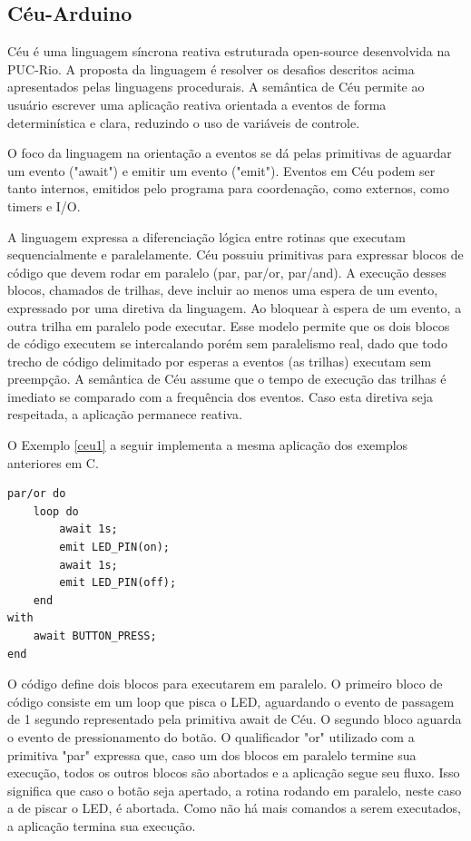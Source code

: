 \documentclass[11pt]{article}
\begin{document}
\subsection{Céu-Arduino}
\tab Céu é uma linguagem síncrona reativa estruturada open-source desenvolvida na PUC-Rio.\cite{santanna2012}\cite{githubceu} A proposta da linguagem é resolver os desafios descritos acima apresentados pelas linguagens procedurais. A semântica de Céu permite ao usuário escrever uma aplicação reativa orientada a eventos de forma determinística e clara, reduzindo o uso de variáveis de controle.
\par O foco da linguagem na orientação a eventos se dá pelas primitivas de aguardar um evento ("await") e emitir um evento ("emit"). Eventos em Céu podem ser tanto internos, emitidos pelo programa para coordenação, como externos, como timers e I/O.
\par A linguagem expressa a diferenciação lógica entre rotinas que executam sequencialmente e paralelamente. Céu possuiu primitivas para expressar blocos de código que devem rodar em paralelo (par, par/or, par/and). A execução desses blocos, chamados de trilhas, deve incluir ao menos uma espera de um evento, expressado por uma diretiva da linguagem. Ao bloquear à espera de um evento, a outra trilha em paralelo pode executar. Esse modelo permite que os dois blocos de código executem se intercalando porém sem paralelismo real, dado que todo trecho de código delimitado por esperas a eventos (as trilhas) executam sem preempção. A semântica de Céu assume que o tempo de execução das trilhas é imediato se comparado com a frequência dos eventos. Caso esta diretiva seja respeitada, a aplicação permanece reativa.
\par O Exemplo \ref{ceu1} a seguir implementa a mesma aplicação dos exemplos anteriores em C.  
\begin{lstlisting}[style=CStyle,label=ceu1,caption=Aplicação em Céu]
par/or do
    loop do
        await 1s;
        emit LED_PIN(on);
        await 1s;
        emit LED_PIN(off);
    end
with
    await BUTTON_PRESS;
end
\end{lstlisting}
\par O código define dois blocos para executarem em paralelo. O primeiro bloco de código consiste em um loop que pisca o LED, aguardando o evento de passagem de 1 segundo representado pela primitiva await de Céu. O segundo bloco aguarda o evento de pressionamento do botão. O qualificador "or" utilizado com a primitiva "par" expressa que, caso um dos blocos em paralelo termine sua execução, todos os outros blocos são abortados e a aplicação segue seu fluxo. Isso significa que caso o botão seja apertado, a rotina rodando em paralelo, neste caso a de piscar o LED, é abortada. Como não há mais comandos a serem executados, a aplicação termina sua execução.
\end{document}
